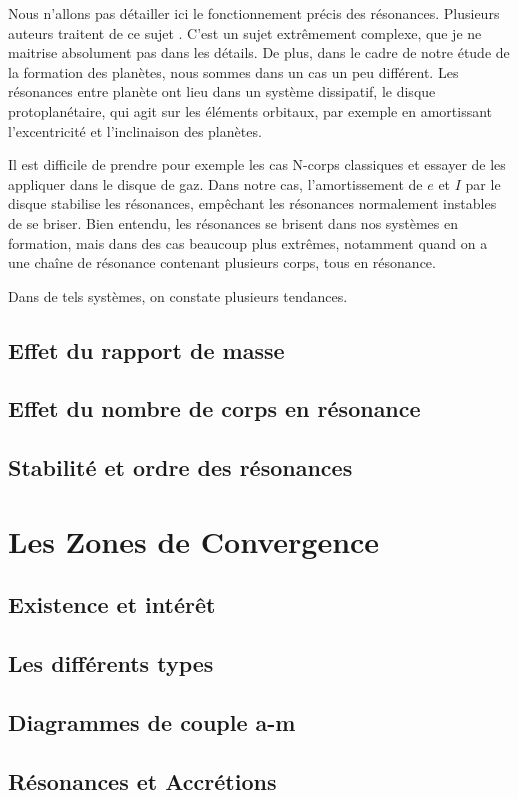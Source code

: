 Nous n'allons pas détailler ici le fonctionnement précis des résonances. Plusieurs auteurs traitent de ce sujet \citep{greenberg1977orbit, peale1986orbital, malhotra1988phd}. C'est un sujet extrêmement complexe, que je ne maitrise absolument pas dans les détails. De plus, dans le cadre de notre étude de la formation des planètes, nous sommes dans un cas un peu différent. Les résonances entre planète ont lieu dans un système dissipatif, le disque protoplanétaire, qui agit sur les éléments orbitaux, par exemple en amortissant l'excentricité et l'inclinaison des planètes.

Il est difficile de prendre pour exemple les cas N-corps classiques et essayer de les appliquer dans le disque de gaz. Dans notre cas, l'amortissement de $e$ et $I$ par le disque stabilise les résonances, empêchant les résonances normalement instables de se briser. Bien entendu, les résonances se brisent dans nos systèmes en formation, mais dans des cas beaucoup plus extrêmes, notamment quand on a une chaîne de résonance contenant plusieurs corps, tous en résonance. 

Dans de tels systèmes, on constate plusieurs tendances. 

\subsection{Effet du rapport de masse}
\subsection{Effet du nombre de corps en résonance}



\subsection{Stabilité et ordre des résonances}

\section{Les Zones de Convergence}
\subsection{Existence et intérêt}
\subsection{Les différents types}\label{sec:CZ-types}
\subsection{Diagrammes de couple a-m}\label{sec:migrations-maps}
\subsection{Résonances et Accrétions}
